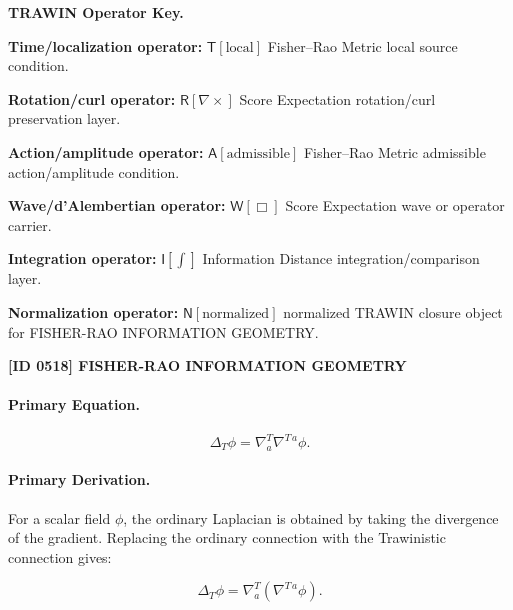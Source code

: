 \par\vspace{0.45\baselineskip}
\noindent\begin{minipage}[t]{\linewidth}
\begingroup
\small
\raggedright
\textbf{TRAWIN Operator Key.}\par
\noindent\textbf{Time/localization operator:} $\mathsf{T}\!\left[\mathrm{local}\right]$ Fisher--Rao Metric local source condition.\par
\noindent\textbf{Rotation/curl operator:} $\mathsf{R}\!\left[\nabla\times\right]$ Score Expectation rotation/curl preservation layer.\par
\noindent\textbf{Action/amplitude operator:} $\mathsf{A}\!\left[\mathrm{admissible}\right]$ Fisher--Rao Metric admissible action/amplitude condition.\par
\noindent\textbf{Wave/d'Alembertian operator:} $\mathsf{W}\!\left[\Box\right]$ Score Expectation wave or operator carrier.\par
\noindent\textbf{Integration operator:} $\mathsf{I}\!\left[\int\right]$ Information Distance integration/comparison layer.\par
\noindent\textbf{Normalization operator:} $\mathsf{N}\!\left[\mathrm{normalized}\right]$ normalized TRAWIN closure object for FISHER-RAO INFORMATION GEOMETRY.\par
\endgroup
\end{minipage}

\clearpage
\noindent\textbf{[ID 0518] FISHER-RAO INFORMATION GEOMETRY}\par
\vspace{0.35em}
\paragraph{Primary Equation.}
\begin{equation}
\Delta_T\phi
=
\nabla^{T}_{a}\nabla^{T\,a}\phi .
\end{equation}

\paragraph{Primary Derivation.}
For a scalar field $\phi$, the ordinary Laplacian is obtained by taking the divergence of the gradient.  
Replacing the ordinary connection with the Trawinistic connection gives:

\begin{equation}
\Delta_T\phi
=
\nabla^{T}_{a}
\left(
\nabla^{T\,a}\phi
\right).
\end{equation}


